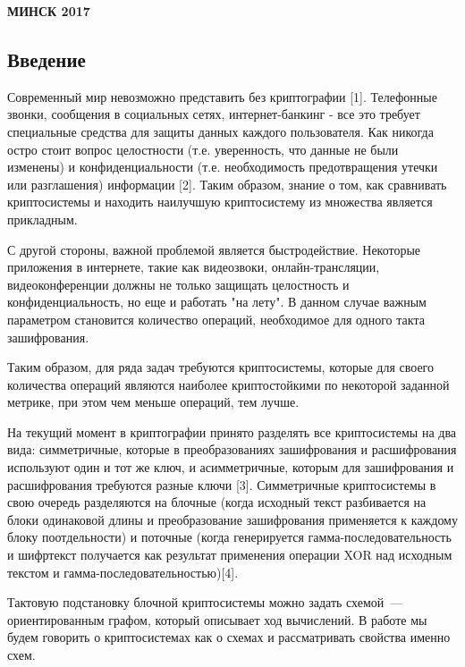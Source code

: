 \documentclass[a4paper,12pt]{extarticle}
\theoremstyle{plain} %
\begin{document}

\begin{center}
\bf{МИНСК 2017}
\end{center}
\begin{large}
\newpage
\tableofcontents
 
\clearpage

\newpage
\section*{Введение}
\vspace*{1cm}

Современный мир невозможно представить без криптографии [1]. Телефонные звонки, сообщения в социальных сетях, интернет-банкинг - все это требует специальные средства для защиты данных каждого пользователя. Как никогда остро стоит вопрос целостности (т.е. уверенность, что данные не были изменены) и конфиденциальности (т.е. необходимость предотвращения утечки или разглашения) информации [2]. Таким образом, знание о том, как сравнивать криптосистемы и находить наилучшую криптосистему из множества является прикладным.

С другой стороны, важной проблемой является быстродействие. Некоторые приложения в интернете, такие как видеозвоки, онлайн-трансляции, видеоконференции должны не только защищать целостность и конфиденциальность, но еще и работать "на лету". В данном случае важным параметром становится количество операций, необходимое для одного такта зашифрования.

Таким образом, для ряда задач требуются криптосистемы, которые для своего количества операций являются наиболее криптостойкими по некоторой заданной метрике, при этом чем меньше операций, тем лучше.

На текущий момент в криптографии принято разделять все криптосистемы на два вида: симметричные, которые в преобразованиях зашифрования и расшифрования используют один и тот же ключ, и асимметричные, которым для зашифрования и расшифрования требуются разные ключи [3]. Симметричные криптосистемы в свою очередь разделяются на блочные (когда исходный текст разбивается на блоки одинаковой длины и преобразование зашифрования применяется к каждому блоку поотдельности) и поточные (когда генерируется гамма-последовательность и шифртекст получается как результат применения операции XOR над исходным текстом и гамма-последовательностью)[4]. 

Тактовую подстановку блочной криптосистемы можно задать схемой~---
ориентированным графом, который описывает ход вычислений. В работе мы будем говорить о криптосистемах как о схемах и рассматривать свойства именно схем.


\end{large}
\end{document}

